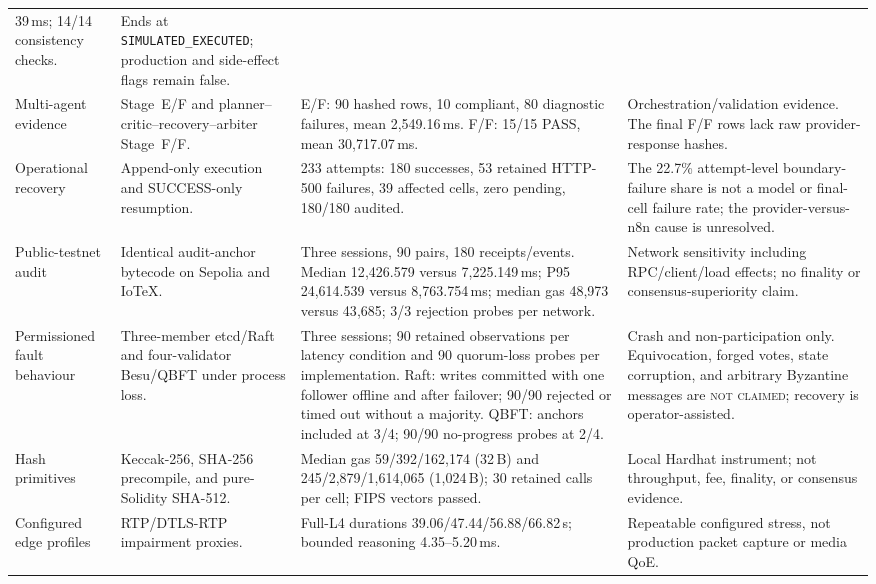 \documentclass[journal]{IEEEtran}
\newcommand{\Eabsent}{\textsc{not claimed}}
\begin{document}
\begin{table}[!t]
\begin{adjustbox}{max width=\textwidth}
\begin{tabular}{L{2.3cm}L{3.5cm}L{6.4cm}L{5.3cm}}
39\,ms; 14/14 consistency checks. &
Ends at \texttt{SIMULATED\_EXECUTED}; production and side-effect flags remain
false. \\
Multi-agent evidence &
Stage~E/F and planner--critic--recovery--arbiter Stage~F/F. &
E/F: 90 hashed rows, 10 compliant, 80 diagnostic failures, mean
2{,}549.16\,ms. F/F: 15/15 PASS, mean 30{,}717.07\,ms. &
Orchestration/validation evidence. The final F/F rows lack raw
provider-response hashes. \\
Operational recovery &
Append-only execution and SUCCESS-only resumption. &
233 attempts: 180 successes, 53 retained HTTP-500 failures, 39 affected
cells, zero pending, 180/180 audited. &
The 22.7\% attempt-level boundary-failure share is not a model or final-cell
failure rate; the provider-versus-n8n cause is unresolved. \\
Public-testnet audit &
Identical audit-anchor bytecode on Sepolia and IoTeX. &
Three sessions, 90 pairs, 180 receipts/events. Median 12{,}426.579 versus
7{,}225.149\,ms; P95 24{,}614.539 versus 8{,}763.754\,ms; median gas 48{,}973
versus 43{,}685; 3/3 rejection probes per network. &
Network sensitivity including RPC/client/load effects; no finality or
consensus-superiority claim. \\
Permissioned fault behaviour &
Three-member etcd/Raft and four-validator Besu/QBFT under process loss. &
Three sessions; 90 retained observations per latency condition and 90
quorum-loss probes per implementation. Raft: writes committed with one
follower offline and after failover; 90/90 rejected or timed out without a
majority. QBFT: anchors included at 3/4; 90/90 no-progress probes at 2/4. &
Crash and non-participation only. Equivocation, forged votes, state
corruption, and arbitrary Byzantine messages are \Eabsent{}; recovery is
operator-assisted. \\
Hash primitives &
Keccak-256, SHA-256 precompile, and pure-Solidity SHA-512. &
Median gas 59/392/162{,}174 (32\,B) and 245/2{,}879/1{,}614{,}065 (1{,}024\,B);
30 retained calls per cell; FIPS vectors passed. &
Local Hardhat instrument; not throughput, fee, finality, or consensus
evidence. \\
Configured edge profiles &
RTP/DTLS-RTP impairment proxies. &
Full-L4 durations 39.06/47.44/56.88/66.82\,s; bounded reasoning
4.35--5.20\,ms. &
Repeatable configured stress, not production packet capture or media QoE. \\
\bottomrule
\end{tabular}
\end{adjustbox}
\end{table}
\end{document}
